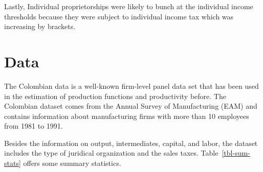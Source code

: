 \documentclass[
  12pt]{article}
\theoremstyle{definition}
\theoremstyle{remark}
\begin{document}
Lastly, Individual proprietorships were likely to bunch at the
individual income thresholds because they were subject to individual
income tax which was increasing by brackets.

\section{Data}\label{data}

The Colombian data is a well-known firm-level panel data set that has
been used in the estimation of production functions and productivity
before. The Colombian dataset comes from the Annual Survey of
Manufacturing (EAM) and contains information about manufacturing firms
with more than 10 employees from 1981 to 1991.

Besides the information on output, intermediates, capital, and labor,
the dataset includes the type of juridical organization and the sales
taxes. Table~\ref{tbl-sum-stats} offers some summary statistics.
\end{document}
